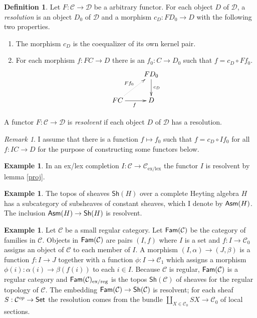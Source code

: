\documentclass[sort&compress]{elsarticle}
\theoremstyle{plain}
\theoremstyle{definition}
\newtheorem{defin}[theorem]{Definition}
\newtheorem{example}[theorem]{Example}
\theoremstyle{remark}
\newtheorem{remark}[theorem]{Remark}
\newcommand\cat\mathcal
\newcommand\exlex{_\mathrm{ex/lex}}\newcommand\exreg{_\mathrm{ex/reg}}
\begin{document}
\begin{defin} Let $F:\cat C\to\cat D$ be a arbitrary functor. For each object $D$ of $\cat D$, a \emph{resolution} is an object $D_0$ of $\cat D$ and a morphism $c_D:FD_0 \to D$ with the following two properties.
\begin{enumerate} 
\item The morphism $c_D$ is the coequalizer of its own kernel pair.
\item For each morphism $f:FC\to D$ there is an $f_0:C\to D_0$ such that $f=c_D\circ Ff_0$. 
\[ \xymatrix{
& FD_0 \ar[d]^{c_D} \\
FC\ar[r]_f \ar@{.>}[ur]^{Ff_0} & D
}\]
\end{enumerate}
A functor $F:\cat C\to\cat D$ is \emph{resolvent} if each object $D$ of $\cat D$ has a resolution.\label{resolve}
\end{defin}

\begin{remark} I assume that there is a function $f\mapsto f_0$ such that $f=c_D\circ If_0$ for all $f:IC\to D$ for the purpose of constructing some functors below. \end{remark}

\begin{example} In an ex/lex completion $I:\cat C \to\cat C\exlex$ the functor $I$ is resolvent by lemma \ref{proj}. \end{example}

\newcommand\Sh{\mathsf{Sh}}
\begin{example} The topos of sheaves $\Sh(H)$ over a complete Heyting algebra $H$ has a subcategory of subsheaves of constant sheaves, which I denote by $\mathsf{Asm}(H)$. The inclusion $\Asm(H) \to\Sh(H)$ is resolvent. \end{example}

\newcommand\dual{^{op}}
\begin{example} Let $\cat C$ be a small regular category. Let $\Fam(\cat C)$ be the category of families in $\cat C$. Objects in $\Fam(\cat C)$ are pairs $(I,f)$ where $I$ is a set and $f:I\to \cat C_0$ assigns an object of $\cat C$ to each member of $I$. A morphism $(I,\alpha) \to (J,\beta)$ is a function $f:I\to J$ together with a function $\phi:I \to \cat C_1$ which assigns a morphism $\phi(i):\alpha(i) \to \beta(f(i))$ to each $i\in I$. Because $\cat C$ is regular, $\Fam(\cat C)$ is a regular category and $\Fam(\cat C)\exreg$ is the topos $\Sh(\cat C)$ of sheaves for the regular topology of $\cat C$. The embedding $\Fam(\cat C)\to\Sh(\cat C)$ is resolvent; for each sheaf $S:\cat C\dual \to \Set$ the resolution comes from the bundle $\coprod_{X\in \cat C_0} SX \to \cat C_0$ of local sections. \label{famex}
\end{example}
\end{document}
